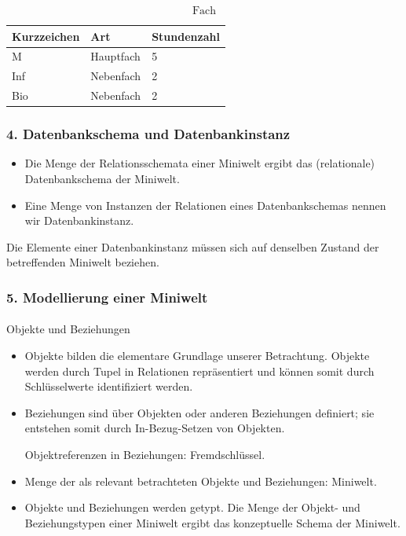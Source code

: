 \documentclass[
  11pt,
  a4paper,
  DIV=11,
  numbers=noendperiod]{scrartcl}
\makeatletter
\let\oldparagraph\paragraph
\renewcommand{\paragraph}{
    \@ifstar
      \xxxParagraphStar
      \xxxParagraphNoStar
  }
\newcommand{\xxxParagraphStar}[1]{\oldparagraph*{#1}\mbox{}}
\newcommand{\xxxParagraphNoStar}[1]{\oldparagraph{#1}\mbox{}}
\providecommand{\tightlist}{%
  \setlength{\itemsep}{0pt}\setlength{\parskip}{0pt}}\usepackage{longtable,booktabs,array}
\makeatother
\begin{document}
\[ \text{Fach} \]

\begin{longtable}[]{@{}lll@{}}
\toprule\noalign{}
Kurzzeichen & Art & Stundenzahl \\
\midrule\noalign{}
\endhead
\bottomrule\noalign{}
\endlastfoot
M & Hauptfach & 5 \\
Inf & Nebenfach & 2 \\
Bio & Nebenfach & 2 \\
\end{longtable}

\subsubsection{4. Datenbankschema und
Datenbankinstanz}\label{datenbankschema-und-datenbankinstanz}

\begin{itemize}
\tightlist
\item
  Die Menge der Relationsschemata einer Miniwelt ergibt das
  (relationale) Datenbankschema der Miniwelt.
\item
  Eine Menge von Instanzen der Relationen eines Datenbankschemas nennen
  wir Datenbankinstanz.
\end{itemize}

Die Elemente einer Datenbankinstanz müssen sich auf denselben Zustand
der betreffenden Miniwelt beziehen.

\subsubsection{5. Modellierung einer
Miniwelt}\label{modellierung-einer-miniwelt}

\paragraph{Objekte und Beziehungen}\label{objekte-und-beziehungen}

\begin{itemize}
\item
  Objekte bilden die elementare Grundlage unserer Betrachtung. Objekte
  werden durch Tupel in Relationen repräsentiert und können somit durch
  Schlüsselwerte identifiziert werden.
\item
  Beziehungen sind über Objekten oder anderen Beziehungen definiert; sie
  entstehen somit durch In-Bezug-Setzen von Objekten.

  Objektreferenzen in Beziehungen: Fremdschlüssel.
\item
  Menge der als relevant betrachteten Objekte und Beziehungen: Miniwelt.
\item
  Objekte und Beziehungen werden getypt. Die Menge der Objekt- und
  Beziehungstypen einer Miniwelt ergibt das konzeptuelle Schema der
  Miniwelt.
\end{itemize}
\end{document}

